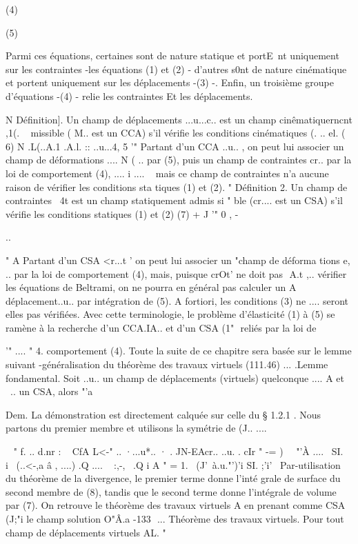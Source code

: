 {{{{(4) 

(5) 



Parmi ces équations, certaines sont de nature statique et portE~nt 
uniquement  sur  les contraintes  -les équations  (1)  et  (2)  - d'autres  s0nt  
de  nature cinématique  et portent uniquement  sur  les déplacements  -(3)  -.  
Enfin,  un  troisième groupe  d'équations  -(4)  - relie les contraintes  Et  
les déplacements.  

N 
Définition]. Un champ de déplacements ...u...c.. est un champ cinêmatiquerncnt 
,1(.­
~ 
missible ( M.. est un CCA) s'il vérifie les conditions cinématiques (.
.. 
el.
( 6) N 
.L(..A.1 .A.l. :: ..u...4,
5
'" 
Partant d'un CCA ..u.. , on peut lui associer un champ de déformations 
.... 
N 
( .. par (5), puis un champ de contraintes cr.. par la loi de comportement (4), 
.... i .... ~ 
mais ce champ de contraintes n'a aucune raison de vérifier les conditions sta­
tiques (1) et (2). 
" 
Définition 2. Un champ de contraintes ~4t est un champ statiquement admis si­
" 
ble (cr.... est un CSA) s'il vérifie les conditions statiques (1) et (2) 
(7) + J '" 0 ,
-{.. 

" 
A Partant d'un CSA <r...t ' on peut lui associer un "champ de déforma­
tions e, .. par la loi de comportement (4), mais, puisque crOt' ne doit pas
 A.t ,.. 
vérifier les équations de Beltrami, on ne pourra en général pas calculer un 
A 
déplacement..u.. par intégration de (5). A fortiori, les conditions (3) ne 
.... 
seront elles pas vérifiées. 
Avec cette terminologie, le problème d'élasticité (1) à (5) se 
ramène à la recherche d'un CCA.IA.. et d'un CSA (1"  reliés par la loi de

'" .... " 4. 
comportement (4). Toute la suite de ce chapitre sera basée sur le lemme 
suivant -généralisation du théorème des travaux virtuels (111.46) 
... 
.Lemme fondamental. Soit ..u.. un champ de déplacements (virtuels) quelconque
.... 
A 
et ~.. un CSA, alors
"'a 

Dem.  La  démonstration  est directement calquée  sur  celle du  §  1.2.1  .  Nous  
partons  du  premier membre  et  utilisons  la  symétrie de  (J..  
....~  

~ 
" f. .. d.nr : ~ CfA L<-" .. ·...u*.. · . JN-EAcr.. ..u. . c\;Ir
"
-=
)~ ~"'À ....~ SI. i~ (..<-,a â , ....) 
.Q .... ~ :,-,~
.Q i %
A " 
= 
1.
~(J'~à.u."')'i SI. ;'i'~ 
Par-utilisation du théorème de la divergence, le premier terme donne l'inté­
grale de surface du second membre de (8), tandis que le second terme donne l'intégrale de volume par (7). On retrouve le théorème des travaux virtuels 
A 
en prenant comme CSA (J;"i le champ solution O"Â.a 
-133 ­
...
Théorème des travaux virtuels. Pour tout champ de déplacements virtuels AL. 
" 

}}}}}
